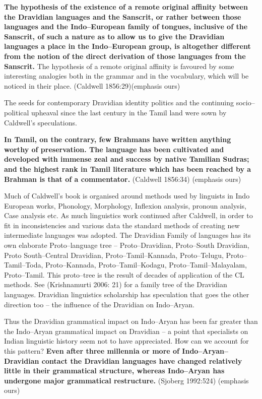 \begin{myquote}
\textbf{The hypothesis of the existence of a remote original affinity between the Dravidian languages and the Sanscrit, or rather between those languages and the Indo–European family of tongues, inclusive of the Sanscrit, of such a nature as to allow us to give the Dravidian languages a place in the Indo–European group, is altogether different from the notion of the direct derivation of those languages from the Sanscrit.} The hypothesis of a remote original affinity is favoured by some interesting analogies both in the grammar and in the vocabulary, which will be noticed in their place. (Caldwell 1856:29)(emphasis ours)
\end{myquote}

The seeds for contemporary Dravidian identity politics and the continuing socio–political upheaval since the last century in the Tamil land were sown by Caldwell’s speculations.

\begin{myquote}
\textbf{In Tamil, on the contrary, few Brahmans have written anything worthy of preservation. The language has been cultivated and developed with immense zeal and success by native Tamilian Sudras; and the highest rank in Tamil literature which has been reached by a Brahman is that of a commentator.} (Caldwell 1856:34) (emphasis ours)
\end{myquote}

Much of Caldwell’s book is organised around methods used by linguists in Indo European works, Phonology, Morphology, Inflexion analysis, pronoun analysis, Case analysis etc. As much linguistics work continued after Caldwell, in order to fit in inconsistencies and various data the standard methods of creating new intermediate languages was adopted. The Dravidian Family of languages has its own elaborate Proto–language tree – Proto–Dravidian, Proto–South Dravidian, Proto South–Central Dravidian, Proto–Tamil–Kannada, Proto–Telugu, Proto–Tamil–Toda, Proto–Kannada, Proto–Tamil–Kodagu, Proto–Tamil–Malayalam, Proto–Tamil. This proto–tree is the result of decades of application of the CL methods. See (Krishnamurti 2006: 21) for a family tree of the Dravidian languages. Dravidian linguistics scholarship has speculation that goes the other direction too – the influence of the Dravidian on Indo–Aryan.

\begin{myquote}
Thus the Dravidian grammatical impact on Indo–Aryan has been far greater than the Indo–Aryan grammatical impact on Dravidian – a point that specialists on Indian linguistic history seem not to have appreciated. How can we account for this pattern? \textbf{Even after three millennia or more of Indo–Aryan–Dravidian contact the Dravidian languages have changed relatively little in their grammatical structure, whereas Indo–Aryan has undergone major grammatical restructure.} (Sjoberg 1992:524) (emphasis ours)
\end{myquote}

